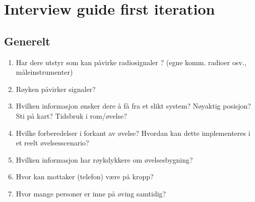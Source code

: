 \documentclass[../Main/thesis.tex]{subfiles}
\begin{document}
\chapter{Interview guide first iteration}
\label{app:interview-guide-first}
\section*{Generelt}
\begin{enumerate}
\item Har dere utstyr som kan påvirke radiosignaler ? (egne komm. radioer osv., måleinstrumenter)
\item Røyken påvirker signaler?
\item Hvilken informasjon ønsker dere å få fra et slikt system? Nøyaktig posisjon? Sti på kart? Tidsbruk i rom/øvelse? 
\item Hvilke forberedelser i forkant av øvelse? Hvordan kan dette implementeres i et reelt øvelsesscenario?
\item Hvilken informasjon har røykdykkere om øvelsesbygning? 
\item Hvor kan mottaker (telefon) være på kropp?
\item Hvor mange personer er inne på øving samtidig?
\end{enumerate}
\end{document}
